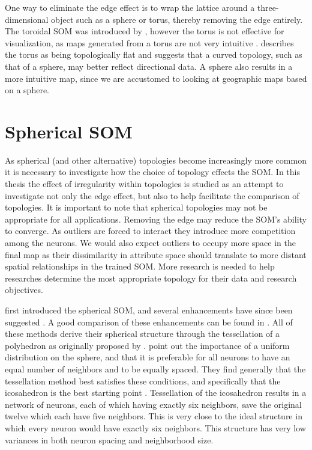 One way to eliminate the edge effect is to wrap the lattice around a
three-dimensional object such as a sphere or torus, thereby removing the edge
entirely. The toroidal SOM was introduced by \cite{li1993}, however the torus
is not effective for visualization, as maps generated from a torus are not
very intuitive \citep{ito2000,wu2006}.  \cite{ritter99} describes the torus as
being topologically flat and suggests that a curved topology, such as that of
a sphere, may better reflect directional data.  A sphere also results in a
more intuitive map, since we are accustomed to looking at geographic maps
based on a sphere.  

\section{Spherical SOM}
As spherical (and other alternative) topologies become
increasingly more common it is necessary to investigate how the choice of
topology effects the SOM.  In this thesis the effect of irregularity within
topologies is studied as an attempt to investigate not only the edge effect,
but also to help facilitate the comparison of topologies.  It is important to
note that spherical topologies may not be appropriate for all applications.
Removing the edge may reduce the SOM's ability to converge.  As outliers are
forced to interact they introduce more competition among the neurons.  We
would also expect outliers to occupy more space in the final map as their
dissimilarity in attribute space should translate to more distant spatial
relationships in the trained SOM.  More research is needed to help researches
determine the most appropriate topology for their data and research objectives.

\cite{ritter99} first introduced the spherical SOM, and several enhancements have
since been suggested \citep{boudjemai2003,sangole03,Nishio:2006fk,wu2006}.  A
good comparison of these enhancements can be found in \cite{wu2006}.  All of
these methods derive their spherical structure through the tessellation of a
polyhedron as originally proposed by \cite{ritter99}.  \cite{wu2006} point
out the importance of a uniform distribution on the sphere, and that it is
preferable for all neurons to have an equal number of neighbors and to be
equally spaced.  They find generally that the tessellation method best satisfies
these conditions, and specifically that the icosahedron is the best starting
point \citep{wu2005}. Tessellation of the icosahedron results in a network of
neurons, each of which having exactly six neighbors, save the original twelve
which each have five neighbors.  This is very close to the ideal structure in which every
neuron would have exactly six neighbors.  This structure has very low variances
in both neuron spacing and neighborhood size. 

